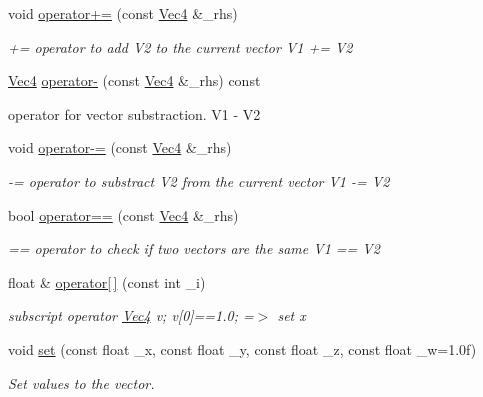 \begin{DoxyCompactItemize}
void \hyperlink{classVec4_a9d7dbf4c6dc031cbed8a0d5938021821}{operator+=} (const \hyperlink{classVec4}{Vec4} \&\_\-rhs)
\begin{DoxyCompactList}\small\item\em += operator to add V2 to the current vector V1 += V2 \item\end{DoxyCompactList}\item 
\hyperlink{classVec4}{Vec4} \hyperlink{classVec4_ae2579c5b5ce533033325ebd78bf3d544}{operator-\/} (const \hyperlink{classVec4}{Vec4} \&\_\-rhs) const 
\begin{DoxyCompactList}\small\item\em 
\begin{DoxyItemize}
\item operator for vector substraction. V1 -\/ V2 
\end{DoxyItemize}\item\end{DoxyCompactList}\item 
void \hyperlink{classVec4_a92e2e5400ea9c6697360462276175034}{operator-\/=} (const \hyperlink{classVec4}{Vec4} \&\_\-rhs)
\begin{DoxyCompactList}\small\item\em -\/= operator to substract V2 from the current vector V1 -\/= V2 \item\end{DoxyCompactList}\item 
bool \hyperlink{classVec4_aa34841d8ecafffb09c3d01e028e0b09e}{operator==} (const \hyperlink{classVec4}{Vec4} \&\_\-rhs)
\begin{DoxyCompactList}\small\item\em == operator to check if two vectors are the same V1 == V2 \item\end{DoxyCompactList}\item 
float \& \hyperlink{classVec4_abc23f7a2a8788cd4ba1bb990f3ad51e4}{operator\mbox{[}$\,$\mbox{]}} (const int \_\-i)
\begin{DoxyCompactList}\small\item\em subscript operator \hyperlink{classVec4}{Vec4} v; v\mbox{[}0\mbox{]}==1.0; =$>$ set x \item\end{DoxyCompactList}\item 
void \hyperlink{classVec4_a48e70640181547614a4d72be0dcb9a35}{set} (const float \_\-x, const float \_\-y, const float \_\-z, const float \_\-w=1.0f)
\begin{DoxyCompactList}\small\item\em Set values to the vector. \item\end{DoxyCompactList}\end{DoxyCompactItemize}
